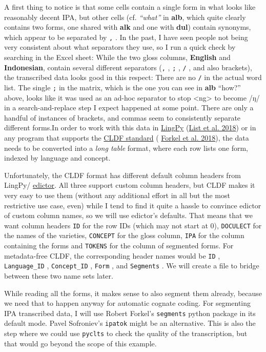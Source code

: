 \documentclass[
  a4paper,
  14pt,
  oneside,
  tablecaptionabove
]{scrbook}
\begin{document}
A first thing to notice is that some cells contain a single form in what
looks like reasonably decent IPA, but other cells (cf.
\emph{\enquote{what}} in \textbf{alb}, which quite clearly contains two
forms, one shared with \textbf{alk} and one with \textbf{dul}) contain
synonyms, which appear to be separated by \lstinline!,! . In the past, I
have seen people not being very consistent about what separators they
use, so I run a quick check by searching in the Excel sheet: While the
two gloss columns, \textbf{English} and \textbf{Indonesian}, contain
several different separators (\lstinline!,! , \lstinline!;! ,
\lstinline!/! , and also brackets), the transcribed data looks good in
this respect: There are no \lstinline!/! in the actual word list. The
single \lstinline!;! in the matrix, which is the one you can see in
\textbf{alb} \enquote{how?} above, looks like it was used as an ad-hoc
separator to stop \textless{}ng\textgreater{} to become /ŋ/ in a
search-and-replace step I expect happened at some point. There are only
a handful of instances of brackets, and commas seem to consistently
separate different forms.In order to work with this data in
\href{http://lingpy.org/}{LingPy} (\href{http://lingpy.org}{List et al.
2018}) or in any program that supports the
\href{https://zenodo.org/record/1252097}{CLDF standard} (
\href{https://cldf.clld.org}{Forkel et al. 2018}), the data needs to be
converted into a \emph{long table} format, where each row lists one
form, indexed by language and concept.

Unfortunately, the CLDF format has different default column headers from
LingPy/ \href{http://edictor.digling.org}{edictor}.  All three support
custom column headers, but CLDF makes it very easy to use them (without
any additional effort in all but the most restrictive use case, even)
while I tend to find it quite a hassle to convince edictor of custom
column names, so we will use edictor's defaults. That means that we want
column headers \lstinline!ID! for the row IDs (which may not start at
0), \lstinline!DOCULECT! for the names of the varieties,
\lstinline!CONCEPT! for the gloss column, \lstinline!IPA! for the column
containing the forms and \lstinline!TOKENS! for the column of segmented
forms. For metadata-free CLDF, the corresponding header names would be
\lstinline!ID! , \lstinline!Language_ID! , \lstinline!Concept_ID! ,
\lstinline!Form! , and \lstinline!Segments! . We will create a file to
bridge between these two name sets later.

While reading all the forms, it makes sense to also segment them
already, because we need that to happen anyway for automatic cognate
coding. For segmenting IPA transcribed data, I will use Robert Forkel's
\lstinline!segments! python package in its default mode. Pavel
Sofroniev's \lstinline!ipatok! might be an alternative. This is also the
step where we could use \lstinline!pyclts! to check the quality of the
transcription, but that would go beyond the scope of this example.
\end{document}
